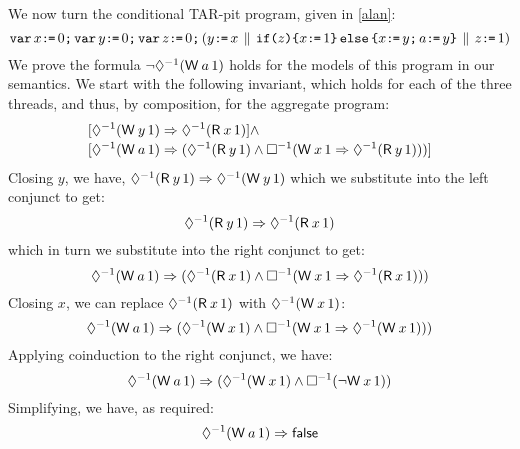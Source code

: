 \begin{example}
We now turn the conditional TAR-pit program, given in \eqref{alan}:
\begin{equation}
  \VAR x\GETS0\SEMI \VAR y\GETS0\SEMI \VAR z\GETS0\SEMI  %
  (
    y\GETS x
  \PAR
    \IF{z}\THEN x\GETS1 \ELSE x\GETS y\SEMI a\GETS y \FI
  \PAR
    z\GETS1
  )
\end{equation}
We prove the formula
\begin{math}
  \lnot\once(\DW{a}{1})
\end{math}
holds for the models of this program in our semantics.  We start with the following invariant,
which holds for each of the three threads, and thus, by composition, for the
aggregate program:
\begin{align*}
  &[\once(\DW{y}{1}) \Rightarrow \once(\DR{x}{1})]
  \land\\[-.5ex]
  &[\once(\DW{a}{1}) \Rightarrow (\once(\DR{y}{1}) \land \always(\DW{x}{1} \Rightarrow \once(\DR{y}{1})))]
\end{align*}
Closing $y$, we have,
\begin{math}
  \once(\DR{y}{1}) \Rightarrow \once(\DW{y}{1}) %
\end{math}
which we substitute into the left conjunct to get:
\begin{displaymath}
  \once(\DR{y}{1}) \Rightarrow \once(\DR{x}{1})
\end{displaymath}
which in turn we substitute into the right conjunct to get:
\begin{displaymath}
  \once(\DW{a}{1}) \Rightarrow (\once(\DR{x}{1}) \land \always(\DW{x}{1} \Rightarrow \once(\DR{x}{1})))
\end{displaymath}
Closing $x$, we can replace $\once(\DR{x}{1})$ with $\once(\DW{x}{1})$:
\begin{displaymath}
  \once(\DW{a}{1}) \Rightarrow (\once(\DW{x}{1}) \land \always(\DW{x}{1} \Rightarrow \once(\DW{x}{1})))
\end{displaymath}
Applying coinduction to the right conjunct, we have:
\begin{displaymath}
  \once(\DW{a}{1}) \Rightarrow (\once(\DW{x}{1}) \land \always(\lnot \DW{x}{1}))
\end{displaymath}
Simplifying, we have, as required:  
\begin{displaymath}
  \once(\DW{a}{1}) \Rightarrow \FALSE
\end{displaymath}
\end{example}

